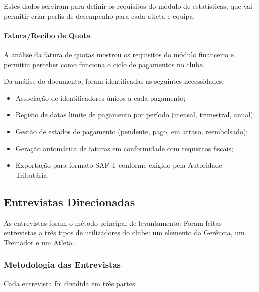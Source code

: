 
Estes dados serviram para definir os requisitos do módulo de estatísticas, que vai permitir criar perfis de desempenho para cada atleta e equipa.

\paragraph{Fatura/Recibo de Quota}

A análise da fatura de quotas mostrou os requisitos do módulo financeiro e permitiu perceber como funciona o ciclo de pagamentos no clube.

Da análise do documento, foram identificadas as seguintes necessidades:
\begin{itemize}
    \item Associação de identificadores únicos a cada pagamento;
    \item Registo de datas limite de pagamento por período (mensal, trimestral, anual);
    \item Gestão de estados de pagamento (pendente, pago, em atraso, reembolsado);
    \item Geração automática de faturas em conformidade com requisitos fiscais;
    \item Exportação para formato SAF-T conforme exigido pela Autoridade Tributária.
\end{itemize}



\newpage
\subsection{Entrevistas Direcionadas}\label{sec:rel_entrevistas}

As entrevistas foram o método principal de levantamento. Foram feitas entrevistas a três tipos de utilizadores do clube: um elemento da Gerência, um Treinador e um Atleta.

\subsubsection{Metodologia das Entrevistas}

Cada entrevista foi dividida em três partes:

